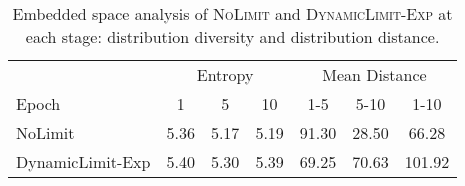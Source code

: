 

\begin{table}[t!]
\centering
\small
\tabcolsep=2.5pt 
\begin{tabular}{lcccccc}
\toprule
       & \multicolumn{3}{c}{Entropy}              & \multicolumn{3}{c}{Mean Distance}        \\ \cmidrule(r){2-4}\cmidrule(r){5-7}
Epoch  & 1     & 5     & 10    & 1-5   & 5-10  & 1-10  \\ \midrule
NoLimit           & 5.36  & 5.17  & 5.19  & 91.30 & 28.50  & 66.28 \\
DynamicLimit-Exp  & 5.40  & 5.30  & 5.39  & 69.25 & 70.63  & 101.92 \\ \bottomrule
\end{tabular}
\caption{Embedded space analysis of \textsc{NoLimit} and \textsc{DynamicLimit-Exp} at each stage: distribution diversity and distribution distance.}
\label{tab:cluster_analysis}
\end{table}


